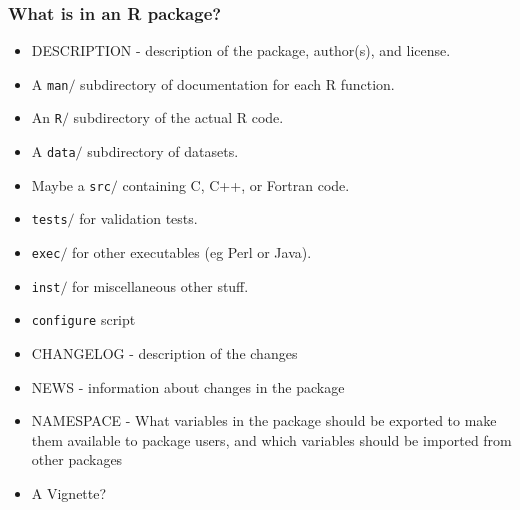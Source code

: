 \documentclass[xcolor=svgnames]{beamer}\usepackage[]{graphicx}\usepackage[]{color}
\begin{document}
\begin{frame}[fragile]
\frametitle{What is in an R package?}
\begin{itemize}
\item DESCRIPTION - description of the package, author(s), and license.
\item A \texttt{man$/$} subdirectory of documentation for each R function.
\item An  \texttt{R$/$} subdirectory of the actual R code.
\item A \texttt{data$/$} subdirectory of datasets.
\item Maybe a \texttt{src$/$} containing C, C++, or Fortran code.
\item \texttt{tests$/$} for validation tests.
\item \texttt{exec$/$} for other executables (eg Perl or Java).
\item \texttt{inst$/$} for miscellaneous other stuff.
\item \texttt{configure} script
\item CHANGELOG - description of the changes
\item NEWS - information about changes in the package
\item NAMESPACE -  What variables in the package should be exported to make them available to package users, and which variables should be imported from other packages
\item A Vignette?
\end{itemize}
\end{frame}
\end{document}
